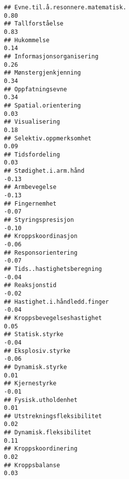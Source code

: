 \documentclass[
]{article}
\begin{document}
\begin{verbatim}
## Evne.til.å.resonnere.matematisk.                                                  0.80
## Tallforståelse                                                                    0.83
## Hukommelse                                                                        0.14
## Informasjonsorganisering                                                          0.26
## Mønstergjenkjenning                                                               0.34
## Oppfatningsevne                                                                   0.34
## Spatial.orientering                                                               0.03
## Visualisering                                                                     0.18
## Selektiv.oppmerksomhet                                                            0.09
## Tidsfordeling                                                                     0.03
## Stødighet.i.arm.hånd                                                             -0.13
## Armbevegelse                                                                     -0.13
## Fingernemhet                                                                     -0.07
## Styringspresisjon                                                                -0.10
## Kroppskoordinasjon                                                               -0.06
## Responsorientering                                                               -0.07
## Tids..hastighetsberegning                                                        -0.04
## Reaksjonstid                                                                     -0.02
## Hastighet.i.håndledd.finger                                                      -0.04
## Kroppsbevegelseshastighet                                                         0.05
## Statisk.styrke                                                                   -0.04
## Eksplosiv.styrke                                                                 -0.06
## Dynamisk.styrke                                                                   0.01
## Kjernestyrke                                                                     -0.01
## Fysisk.utholdenhet                                                                0.01
## Utstrekningsfleksibilitet                                                         0.02
## Dynamisk.fleksibilitet                                                            0.11
## Kroppskoordinering                                                                0.02
## Kroppsbalanse                                                                     0.03

\end{verbatim}
\end{document}
